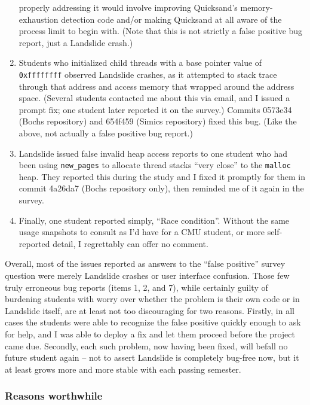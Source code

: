 \begin{enumerate}
		properly addressing it would involve improving Quicksand's memory-exhaustion detection code
		and/or making Quicksand at all aware of the process limit to begin with.
		(Note that this is not strictly a false positive bug report, just a Landslide crash.)
	\item Students who initialized child threads with a base pointer value of {\tt 0xffffffff} observed Landslide crashes,
		as it attempted to stack trace through that address and access memory that wrapped around the address space.
		(Several students contacted me about this via email, and I issued a prompt fix;
		one student later reported it on the survey.)
		Commits 0573e34 (Bochs repository) and 654f459 (Simics repository) fixed this bug.
		(Like the above, not actually a false positive bug report.)
	\item Landslide issued false invalid heap access reports to one student
		who had been using {\tt new\_pages} to allocate thread stacks ``very close'' to the {\tt malloc} heap.
		They reported this during the study and I fixed it promptly for them in commit 4a26da7 (Bochs repository only),
		then reminded me of it again in the survey.
	\item Finally, one student reported simply, ``Race condition''.
		Without the same usage snapshots to consult as I'd have for a CMU student,
		or more self-reported detail, I regrettably can offer no comment.
\end{enumerate}

\noindent
Overall, most of the issues reported as answers to the ``false positive'' survey question
were merely Landslide crashes or user interface confusion.
Those few truly erroneous bug reports (items 1, 2, and 7),
while certainly guilty of burdening %
students with worry over whether the problem is their own code or in Landslide itself,
are at least not too discouraging for two reasons.
Firstly, in all cases the students were able to recognize the false positive quickly enough to ask for help,
and I was able to deploy a fix and let them proceed before the project came due.
Secondly, each such problem, now having been fixed, will befall no future student again --
not to assert Landslide is completely bug-free now,
but it at least grows more and more stable with each passing semester.

\subsubsection{Reasons worthwhile}

